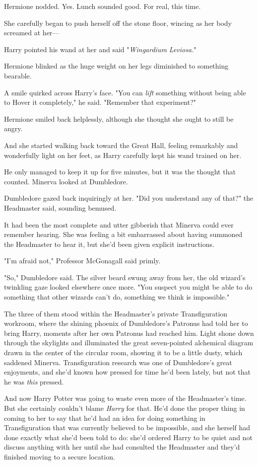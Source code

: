 Hermione nodded. Yes. Lunch sounded good. For real, this time.

She carefully began to push herself off the stone floor, wincing as her body
screamed at her---

Harry pointed his wand at her and said "\emph{Wingardium Leviosa.}"

Hermione blinked as the huge weight on her legs diminished to something
bearable.

A smile quirked across Harry's face. "You can \emph{lift} something without
being able to Hover it completely," he said. "Remember that experiment?"

Hermione smiled back helplessly, although she thought she ought to still be
angry.

And she started walking back toward the Great Hall, feeling remarkably and
wonderfully light on her feet, as Harry carefully kept his wand trained on her.

He only managed to keep it up for five minutes, but it was the thought that
counted.
\later
Minerva looked at Dumbledore.

Dumbledore gazed back inquiringly at her. "Did you understand any of that?" the
Headmaster said, sounding bemused.

It had been the most complete and utter gibberish that Minerva could ever
remember hearing. She was feeling a bit embarrassed about having summoned the
Headmaster to hear it, but she'd been given explicit instructions.

"I'm afraid not," Professor McGonagall said primly.

"So," Dumbledore said. The silver beard swung away from her, the old wizard's
twinkling gaze looked elsewhere once more. "You suspect you might be able to do
something that other wizards can't do, something we think is impossible."

The three of them stood within the Headmaster's private Transfiguration
workroom, where the shining phoenix of Dumbledore's Patronus had told her to
bring Harry, moments after her own Patronus had reached him. Light shone down
through the skylights and illuminated the great seven-pointed alchemical
diagram drawn in the center of the circular room, showing it to be a little
dusty, which saddened Minerva. Transfiguration research was one of Dumbledore's
great enjoyments, and she'd known how pressed for time he'd been lately, but
not that he was \emph{this} pressed.

And now Harry Potter was going to waste even more of the Headmaster's time. But
she certainly couldn't blame \emph{Harry} for that. He'd done the proper thing
in coming to her to say that he'd had an idea for doing something in
Transfiguration that was currently believed to be impossible, and she herself
had done exactly what she'd been told to do: she'd ordered Harry to be quiet
and not discuss anything with her until she had consulted the Headmaster and
they'd finished moving to a secure location.

